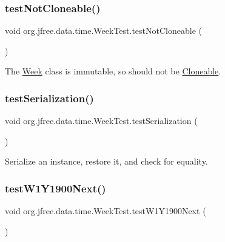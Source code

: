 \subsubsection{\texorpdfstring{test\+Not\+Cloneable()}{testNotCloneable()}}
{\footnotesize\ttfamily void org.\+jfree.\+data.\+time.\+Week\+Test.\+test\+Not\+Cloneable (\begin{DoxyParamCaption}{ }\end{DoxyParamCaption})}

The \mbox{\hyperlink{classorg_1_1jfree_1_1data_1_1time_1_1_week}{Week}} class is immutable, so should not be \mbox{\hyperlink{}{Cloneable}}. \mbox{\label{classorg_1_1jfree_1_1data_1_1time_1_1_week_test_a7f4a825018c3aee37421021de39e897d}} 
\subsubsection{\texorpdfstring{test\+Serialization()}{testSerialization()}}
{\footnotesize\ttfamily void org.\+jfree.\+data.\+time.\+Week\+Test.\+test\+Serialization (\begin{DoxyParamCaption}{ }\end{DoxyParamCaption})}

Serialize an instance, restore it, and check for equality. \mbox{\label{classorg_1_1jfree_1_1data_1_1time_1_1_week_test_a5fb947ca0b77238be416b5f8fcb4210b}} 
\subsubsection{\texorpdfstring{test\+W1\+Y1900\+Next()}{testW1Y1900Next()}}
{\footnotesize\ttfamily void org.\+jfree.\+data.\+time.\+Week\+Test.\+test\+W1\+Y1900\+Next (\begin{DoxyParamCaption}{ }\end{DoxyParamCaption})}

